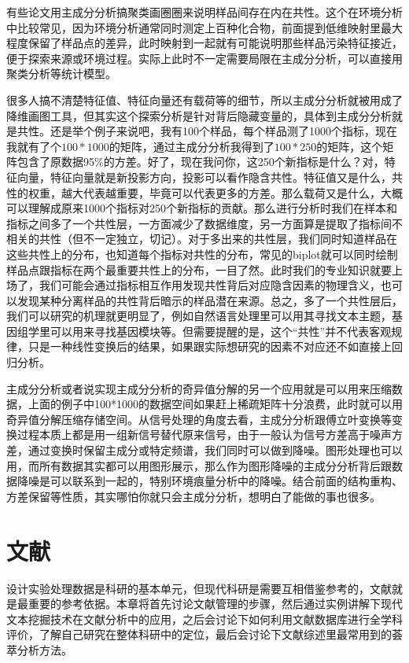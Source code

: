 \documentclass[]{tufte-book}
\begin{document}
有些论文用主成分分析搞聚类画圈圈来说明样品间存在内在共性。这个在环境分析中比较常见，因为环境分析通常同时测定上百种化合物，前面提到低维映射里最大程度保留了样品点的差异，此时映射到一起就有可能说明那些样品污染特征接近，便于探索来源或环境过程。实际上此时不一定需要局限在主成分分析，可以直接用聚类分析等统计模型。

很多人搞不清楚特征值、特征向量还有载荷等的细节，所以主成分分析就被用成了降维画图工具，但其实这个探索分析是针对背后隐藏变量的，具体到主成分分析就是共性。还是举个例子来说吧，我有100个样品，每个样品测了1000个指标，现在我就有了个\(100*1000\)的矩阵，通过主成分分析我得到了\(100*250\)的矩阵，这个矩阵包含了原数据95\%的方差。好了，现在我问你，这250个新指标是什么？对，特征向量，特征向量就是新投影方向，投影可以看作隐含共性。特征值又是什么，共性的权重，越大代表越重要，毕竟可以代表更多的方差。那么载荷又是什么，大概可以理解成原来1000个指标对250个新指标的贡献。那么进行分析时我们在样本和指标之间多了一个共性层，一方面减少了数据维度，另一方面算是提取了指标间不相关的共性（但不一定独立，切记）。对于多出来的共性层，我们同时知道样品在这些共性上的分布，也知道每个指标对共性的分布，常见的biplot就可以同时绘制样品点跟指标在两个最重要共性上的分布，一目了然。此时我们的专业知识就要上场了，我们可能会通过指标相互作用发现共性背后对应隐含因素的物理含义，也可以发现某种分离样品的共性背后暗示的样品潜在来源。总之，多了一个共性层后，我们可以研究的机理就更明显了，例如自然语言处理里可以用其寻找文本主题，基因组学里可以用来寻找基因模块等。但需要提醒的是，这个``共性''并不代表客观规律，只是一种线性变换后的结果，如果跟实际想研究的因素不对应还不如直接上回归分析。

主成分分析或者说实现主成分分析的奇异值分解的另一个应用就是可以用来压缩数据，上面的例子中100*1000的数据空间如果赶上稀疏矩阵十分浪费，此时就可以用奇异值分解压缩存储空间。从信号处理的角度去看，主成分分析跟傅立叶变换等变换过程本质上都是用一组新信号替代原来信号，由于一般认为信号方差高于噪声方差，通过变换时保留主成分或特定频谱，我们同时可以做到降噪。图形处理也可以用，而所有数据其实都可以用图形展示，那么作为图形降噪的主成分分析背后跟数据降噪是可以联系到一起的，特别环境痕量分析中的降噪。结合前面的结构重构、方差保留等性质，其实哪怕你就只会主成分分析，想明白了能做的事也很多。

\hypertarget{lib}{%
\chapter{文献}\label{lib}}

设计实验处理数据是科研的基本单元，但现代科研是需要互相借鉴参考的，文献就是最重要的参考依据。本章将首先讨论文献管理的步骤，然后通过实例讲解下现代文本挖掘技术在文献分析中的应用，之后会讨论下如何利用文献数据库进行全学科评价，了解自己研究在整体科研中的定位，最后会讨论下文献综述里最常用到的荟萃分析方法。
\end{document}
